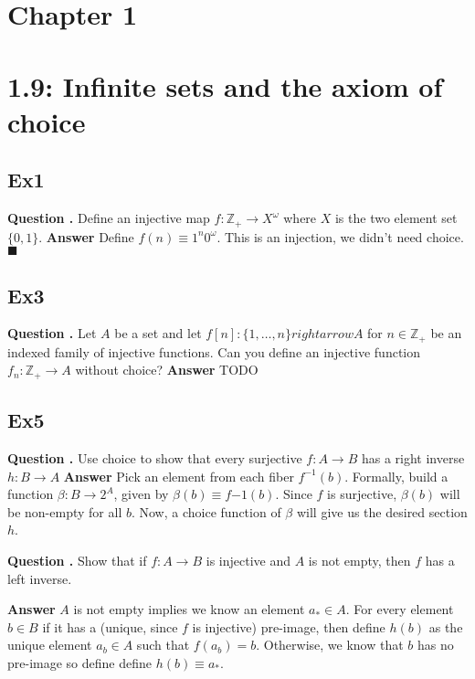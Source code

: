 \documentclass{article}
\begin{document}
\newcommand*{\Z}{\mathbb Z}
\newcommand*{\start}[1]{\leavevmode\newline \textbf{#1} }
\newcommand*{\question}[1]{\leavevmode\newline \textbf{Question #1.}}
\newcommand*{\proof}[1]{\leavevmode\newline \textbf{Proof #1}}
\newcommand*{\answer}{\leavevmode\newline \textbf{Answer} }
\newcommand*{\qed}{\ensuremath{\blacksquare}}


\section{Chapter 1}
\section{1.9: Infinite sets and the axiom of choice}
\subsection{Ex1}
\question{} Define an injective map $f: \Z_+ \rightarrow X^\omega$ where $X$ is the two element set $\{0, 1\}$.
\answer Define $f(n) \equiv 1^n 0^\omega$. This is an injection, we didn't need choice. \qed

\subsection{Ex3}
\question{} Let $A$ be a set and let $f[n] : \{1, \dots, n \} rightarrow A$ for $n \in \mathbb Z_+$ be an indexed family of injective functions. Can you define
an injective function $f_n: \Z_+ \rightarrow A$ without choice?
\answer TODO

\subsection{Ex5}
\question{} Use choice to show that every surjective $f: A \rightarrow B$ has a right inverse $h: B \rightarrow A$
\answer Pick an element from each fiber $f^{-1}(b)$. Formally, build a function $\beta: B \rightarrow 2^A$, given by  $\beta(b) \equiv f{-1}(b)$. Since $f$ is surjective,
$\beta(b)$ will be non-empty for all $b$. Now, a choice function of $\beta$ will give us the desired section $h$.

\question{} Show that if $f: A \rightarrow B$ is injective and $A$ is not empty, then $f$ has a left inverse.

\answer $A$ is not empty implies we know an element $a_* \in A$. For every element $b \in B$ if it has a (unique, since $f$ is injective) pre-image, then define
$h(b)$ as the unique element $a_b \in A$ such that $f(a_b) = b$. Otherwise, we know that $b$ has no pre-image so define define $h(b) \equiv a_*$.
\end{document}
